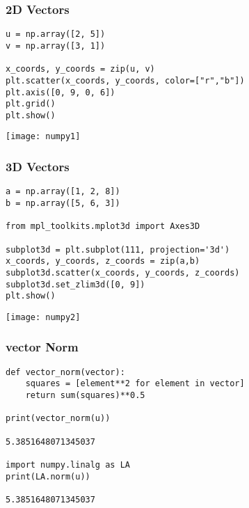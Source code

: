 \begin{frame}[fragile] \frametitle{2D Vectors}

\begin{lstlisting}
u = np.array([2, 5])
v = np.array([3, 1])

x_coords, y_coords = zip(u, v)
plt.scatter(x_coords, y_coords, color=["r","b"])
plt.axis([0, 9, 0, 6])
plt.grid()
plt.show()
\end{lstlisting}

\begin{center}
\texttt{[image: numpy1]}
\end{center}

\end{frame}

 \begin{frame}[fragile] \frametitle{3D Vectors}

\begin{lstlisting}
a = np.array([1, 2, 8])
b = np.array([5, 6, 3])

from mpl_toolkits.mplot3d import Axes3D

subplot3d = plt.subplot(111, projection='3d')
x_coords, y_coords, z_coords = zip(a,b)
subplot3d.scatter(x_coords, y_coords, z_coords)
subplot3d.set_zlim3d([0, 9])
plt.show()
\end{lstlisting}

\begin{center}
\texttt{[image: numpy2]}
\end{center}

\end{frame}


 \begin{frame}[fragile] \frametitle{vector Norm}

\begin{lstlisting}
def vector_norm(vector):
    squares = [element**2 for element in vector]
    return sum(squares)**0.5

print(vector_norm(u))

5.3851648071345037

import numpy.linalg as LA
print(LA.norm(u))

5.3851648071345037

\end{lstlisting}
\end{frame}


